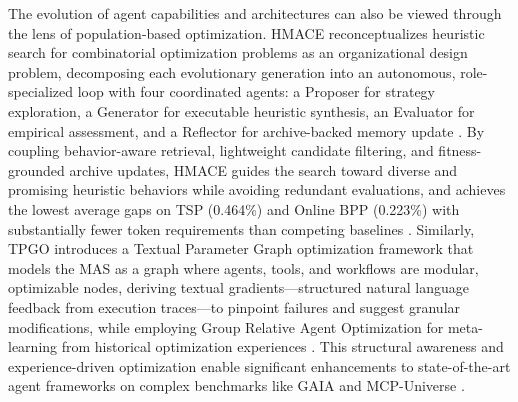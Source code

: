 \documentclass[11pt]{article}
\begin{document}
The evolution of agent capabilities and architectures can also be viewed through the lens of population-based optimization. HMACE reconceptualizes heuristic search for combinatorial optimization problems as an organizational design problem, decomposing each evolutionary generation into an autonomous, role-specialized loop with four coordinated agents: a Proposer for strategy exploration, a Generator for executable heuristic synthesis, an Evaluator for empirical assessment, and a Reflector for archive-backed memory update \cite{ref273}. By coupling behavior-aware retrieval, lightweight candidate filtering, and fitness-grounded archive updates, HMACE guides the search toward diverse and promising heuristic behaviors while avoiding redundant evaluations, and achieves the lowest average gaps on TSP (0.464\%) and Online BPP (0.223\%) with substantially fewer token requirements than competing baselines \cite{ref273}. Similarly, TPGO introduces a Textual Parameter Graph optimization framework that models the MAS as a graph where agents, tools, and workflows are modular, optimizable nodes, deriving textual gradients---structured natural language feedback from execution traces---to pinpoint failures and suggest granular modifications, while employing Group Relative Agent Optimization for meta-learning from historical optimization experiences \cite{ref274}. This structural awareness and experience-driven optimization enable significant enhancements to state-of-the-art agent frameworks on complex benchmarks like GAIA and MCP-Universe \cite{ref274}.
\end{document}
